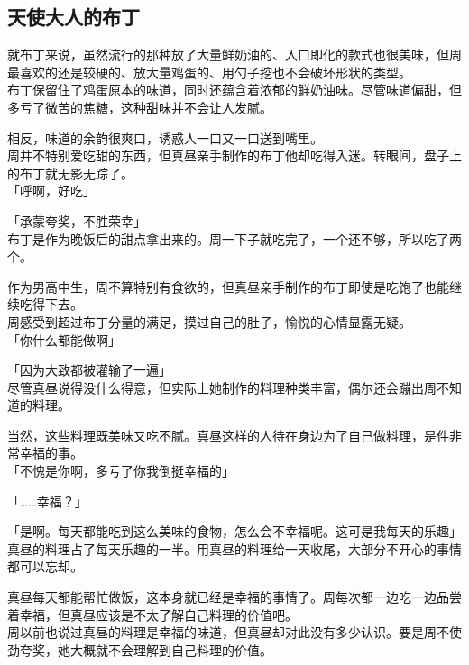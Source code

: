 \subsection{天使大人的布丁}

就布丁来说，虽然流行的那种放了大量鲜奶油的、入口即化的款式也很美味，但周最喜欢的还是较硬的、放大量鸡蛋的、用勺子挖也不会破坏形状的类型。\\

布丁保留住了鸡蛋原本的味道，同时还蕴含着浓郁的鲜奶油味。尽管味道偏甜，但多亏了微苦的焦糖，这种甜味并不会让人发腻。

相反，味道的余韵很爽口，诱惑人一口又一口送到嘴里。\\

周并不特别爱吃甜的东西，但真昼亲手制作的布丁他却吃得入迷。转眼间，盘子上的布丁就无影无踪了。\\

「呼啊，好吃」

「承蒙夸奖，不胜荣幸」\\

布丁是作为晚饭后的甜点拿出来的。周一下子就吃完了，一个还不够，所以吃了两个。

作为男高中生，周不算特别有食欲的，但真昼亲手制作的布丁即使是吃饱了也能继续吃得下去。\\

周感受到超过布丁分量的满足，摸过自己的肚子，愉悦的心情显露无疑。\\

「你什么都能做啊」

「因为大致都被灌输了一遍」\\

尽管真昼说得没什么得意，但实际上她制作的料理种类丰富，偶尔还会蹦出周不知道的料理。

当然，这些料理既美味又吃不腻。真昼这样的人待在身边为了自己做料理，是件非常幸福的事。\\

「不愧是你啊，多亏了你我倒挺幸福的」

「……幸福？」

「是啊。每天都能吃到这么美味的食物，怎么会不幸福呢。这可是我每天的乐趣」\\

真昼的料理占了每天乐趣的一半。用真昼的料理给一天收尾，大部分不开心的事情都可以忘却。

真昼每天都能帮忙做饭，这本身就已经是幸福的事情了。周每次都一边吃一边品尝着幸福，但真昼应该是不太了解自己料理的价值吧。\\

周以前也说过真昼的料理是幸福的味道，但真昼却对此没有多少认识。要是周不使劲夸奖，她大概就不会理解到自己料理的价值。

